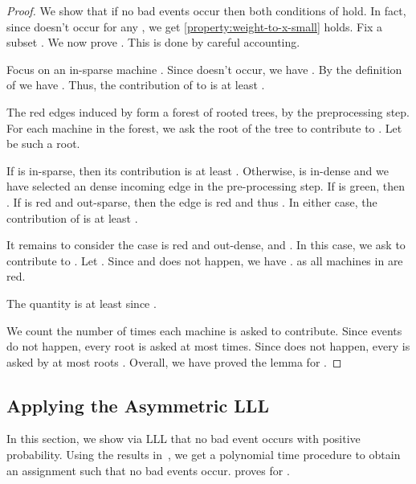 \documentclass[11pt]{article}
\newcounter{prop}
\begin{document}
\begin{proof}
We show that if no bad events occur then both conditions of  hold. In fact, since  doesn't occur for any , we get \ref{property:weight-to-x-small} holds.  Fix a subset .  We now prove .   This is done by careful accounting.


Focus on an in-sparse machine .  Since  doesn't occur, we have .  By the definition of  we have . Thus, the contribution of  to  is at least .









The red edges induced by  form a forest of rooted trees, by the preprocessing step.   For each machine in the forest, we ask the root of the tree to contribute to . Let  be such a root.

If  is in-sparse, then its contribution is at least . Otherwise,  is in-dense and we have selected an dense incoming edge  in the pre-processing step.  If  is green, then .  If  is red and out-sparse, then the edge  is red and thus .  In either case, the contribution of  is at least . 

It remains to consider the case  is red and out-dense, and . In this case, we ask  to contribute to .   Let . Since   and  does not happen, we have .  as all machines in  are red.
\ifdefined\CR

\else

\fi
The quantity is at least  since  .

We count the number of times each machine is asked to contribute.  Since   events do not happen, every root  is asked at most  times.  Since  does not happen, every  is asked by at most  roots . Overall,  we have proved the lemma for .

\end{proof}

\subsection{Applying the Asymmetric LLL}
In this section, we show via LLL that no bad event occurs with positive probability. Using the results in~\cite{MT10,HSS11}, we get a polynomial time procedure to obtain an assignment such that no bad events occur.  proves  for .  
\end{document}
